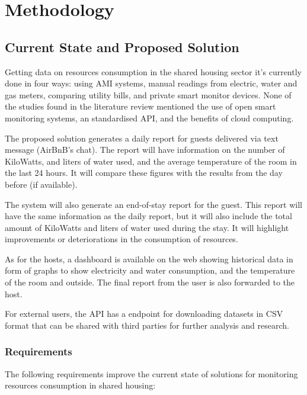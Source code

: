 

\chapter{Methodology}

\section{Current State and Proposed Solution}

Getting data on resources consumption in the shared housing sector it's currently done in four ways: using AMI systems, 
manual readings from electric, water and gas meters, comparing utility bills, and private smart monitor devices. None of
the studies found in the literature review mentioned the use of open smart monitoring systems, an standardised API, and 
the benefits of cloud computing.

The proposed solution generates a daily report for guests delivered via text message (AirBnB's chat). The report will 
have information on the number of KiloWatts, and liters of water used, and the average temperature of the room in the 
last 24 hours. It will compare these figures with the results from the day before (if available). 

The system will also generate an end-of-stay report for the guest. This report will have the same information as the 
daily report, but it will also include the total amount of KiloWatts and liters of water used during the stay. It will
highlight improvements or deteriorations in the consumption of resources.

As for the hosts, a dashboard is available on the web showing historical data in form of graphs to show electricity and
water consumption, and the temperature of the room and outside. The final report from the user is also forwarded to the 
host.

For external users, the API has a endpoint for downloading datasets in CSV format that can be shared with third parties
for further analysis and research.

\subsection{Requirements}
The following requirements improve the current state of solutions for monitoring resources consumption in 
shared housing:

